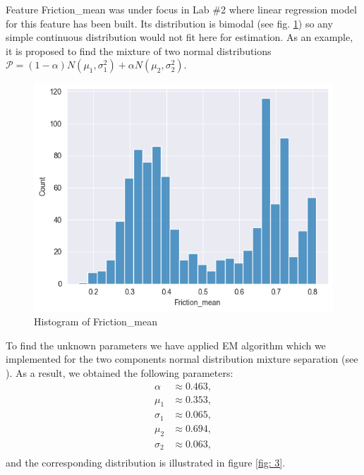 \documentclass[12pt, bachelor, substylefile = algo_title.rtx]{disser}
\newcommand{\Pb}{\mathcal{P}}
\theoremstyle{definition}
\begin{document}
Feature Friction\_mean was under focus in Lab \#2 where linear regression model for this feature has been built. Its distribution is bimodal (see fig. \ref{fig: 2}) so any simple continuous distribution would not fit here for estimation. As an example, it is proposed to find   the mixture of two normal distributions $\Pb = (1-\alpha) N(\mu_1, \sigma^2_1) + \alpha N(\mu_2, \sigma^2_2)$. 

\begin{figure}[!h]
\centering
   \begin{minipage}{0.7\textwidth}
     \includegraphics[width=\linewidth]{friction}
   \end{minipage}
\caption{Histogram of Friction\_mean}
\label{fig: 2}
\end{figure}

To find the unknown parameters we have applied EM algorithm which we implemented for the two components normal distribution mixture separation (see \cite{repogithub}). As a result, we obtained the following parameters:
\begin{align*}
\alpha & \approx 0.463,\\
\mu_1 & \approx 0.353,\\
\sigma_1 & \approx 0.065,\\
\mu_2 & \approx 0.694,\\
\sigma_2 & \approx 0.063,\\
\end{align*}
and the corresponding distribution is illustrated in figure \ref{fig: 3}.
\end{document}
